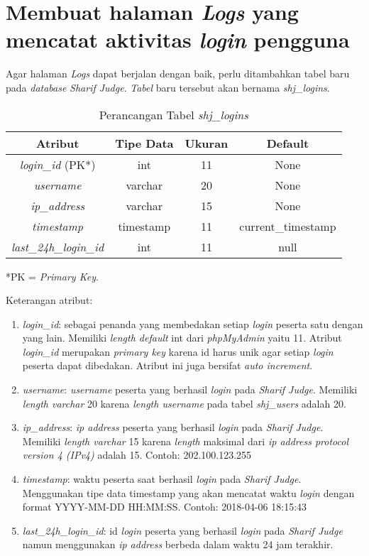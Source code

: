 \section{Membuat halaman \textit{Logs} yang mencatat aktivitas \textit{login} pengguna}
Agar halaman \textit{Logs} dapat berjalan dengan baik, perlu ditambahkan tabel baru pada \textit{database} \textit{Sharif Judge}.  \textit{Tabel} baru tersebut akan bernama \textit{shj\_logins}. 
\begin{table}[H] %
	\centering 
	\caption{Perancangan Tabel \textit{shj\_logins}}
	\label{tab:tabellogs}
		\begin{tabular}{|c|c|c|c|}
			\hline
			\textbf{Atribut} & \textbf{Tipe Data} & \textbf{Ukuran}  & \textbf{Default} \\
			\hline
			\textit{login\_id} (PK*) & int & 11  & None \\
			\hline
			\textit{username} & varchar & 20  & None \\
			\hline
			\textit{ip\_address} & varchar & 15  & None \\
			\hline
			\textit{timestamp} & timestamp & 11  & current\_timestamp \\
			\hline
			\textit{last\_24h\_login\_id}	 & int & 11  & null \\
			\hline
		\end{tabular}
\end{table}
*PK = \textit{Primary Key}.

Keterangan atribut:
\begin{enumerate}
	\item \textit{login\_id}: sebagai penanda yang membedakan setiap \textit{login} peserta satu dengan yang lain. Memiliki \textit{length default} int dari \textit{phpMyAdmin} yaitu 11. Atribut \textit{login\_id} merupakan \textit{primary key} karena id harus unik agar setiap \textit{login} peserta dapat dibedakan. Atribut ini juga bersifat \textit{auto increment}.
	\item \textit{username}: \textit{username} peserta yang berhasil \textit{login} pada \textit{Sharif Judge}. Memiliki \textit{length varchar} 20 karena \textit{length username} pada tabel \textit{shj\_users} adalah 20.
	\item \textit{ip\_address}: \textit{ip address} peserta yang berhasil \textit{login} pada \textit{Sharif Judge}. Memiliki \textit{length varchar} 15 karena \textit{length} maksimal dari \textit{ip address protocol version 4 (IPv4)} adalah 15. Contoh: 202.100.123.255
	\item \textit{timestamp}: waktu peserta saat berhasil \textit{login} pada \textit{Sharif Judge}. Menggunakan tipe data timestamp yang akan mencatat waktu \textit{login} dengan format YYYY-MM-DD HH:MM:SS. Contoh: 2018-04-06 18:15:43
	\item \textit{last\_24h\_login\_id}: id \textit{login} peserta yang berhasil \textit{login} pada \textit{Sharif Judge} namun menggunakan \textit{ip address} berbeda dalam waktu 24 jam terakhir.
\end{enumerate}

